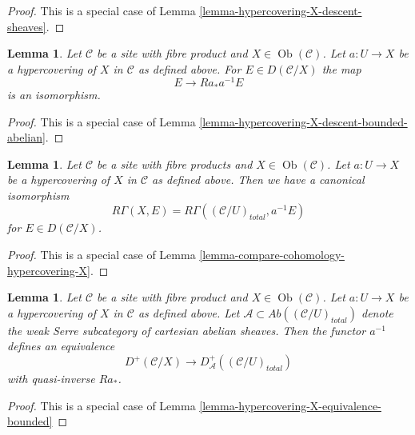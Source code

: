 \documentclass{stacks-project}
\theoremstyle{plain}
\newtheorem{lemma}[subsection]{Lemma}
\theoremstyle{definition}
\theoremstyle{remark}
\numberwithin{equation}{subsection}
\def\Ob{\mathop{\mathrm{Ob}}\nolimits}
\begin{document}
\begin{proof}
This is a special case of
Lemma \ref{lemma-hypercovering-X-descent-sheaves}.
\end{proof}

\begin{lemma}
\label{lemma-hypercovering-X-simple-descent-bounded-abelian}
Let $\mathcal{C}$ be a site with fibre product and $X \in \Ob(\mathcal{C})$.
Let $a : U \to X$ be a hypercovering of $X$ in $\mathcal{C}$ as defined above.
For $E \in D(\mathcal{C}/X)$ the map
$$
E \longrightarrow Ra_*a^{-1}E
$$
is an isomorphism.
\end{lemma}

\begin{proof}
This is a special case of
Lemma \ref{lemma-hypercovering-X-descent-bounded-abelian}.
\end{proof}

\begin{lemma}
\label{lemma-compare-cohomology-hypercovering-X-simple}
Let $\mathcal{C}$ be a site with fibre products and $X \in \Ob(\mathcal{C})$.
Let $a : U \to X$ be a hypercovering of $X$ in $\mathcal{C}$ as defined above.
Then we have a canonical isomorphism
$$
R\Gamma(X, E) = R\Gamma((\mathcal{C}/U)_{total}, a^{-1}E)
$$
for $E \in D(\mathcal{C}/X)$.
\end{lemma}

\begin{proof}
This is a special case of
Lemma \ref{lemma-compare-cohomology-hypercovering-X}.
\end{proof}

\begin{lemma}
\label{lemma-hypercovering-X-simple-equivalence-bounded}
Let $\mathcal{C}$ be a site with fibre product and $X \in \Ob(\mathcal{C})$.
Let $a : U \to X$ be a hypercovering of $X$ in $\mathcal{C}$ as defined above.
Let $\mathcal{A} \subset \textit{Ab}((\mathcal{C}/U)_{total})$
denote the weak Serre subcategory of cartesian abelian sheaves.
Then the functor $a^{-1}$ defines an equivalence
$$
D^+(\mathcal{C}/X) \longrightarrow D_\mathcal{A}^+((\mathcal{C}/U)_{total})
$$
with quasi-inverse $Ra_*$.
\end{lemma}

\begin{proof}
This is a special case of
Lemma \ref{lemma-hypercovering-X-equivalence-bounded}
\end{proof}
\end{document}
